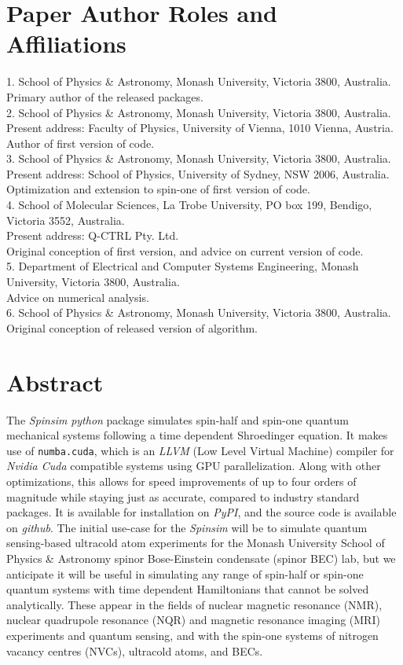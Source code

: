 \documentclass{jors}
\begin{document}
\section{Paper Author Roles and Affiliations}
1. School of Physics \& Astronomy, Monash University, Victoria 3800, Australia.\\
	Primary author of the released packages.\\
2. School of Physics \& Astronomy, Monash University, Victoria 3800, Australia.\\
	Present address: Faculty of Physics, University of Vienna, 1010 Vienna, Austria.\\
	Author of first version of code.\\
3. School of Physics \& Astronomy, Monash University, Victoria 3800, Australia.\\
	Present address: School of Physics, University of Sydney, NSW 2006, Australia.\\
	Optimization and extension to spin-one of first version of code.\\
4. School of Molecular Sciences, La Trobe University, PO box 199, Bendigo, Victoria 3552, Australia.\\
	Present address: Q-CTRL Pty. Ltd.\\
	Original conception of first version, and advice on current version of code.\\
5. Department of Electrical and Computer Systems Engineering, Monash University, Victoria 3800, Australia.\\
	Advice on numerical analysis.\\
6. School of Physics \& Astronomy, Monash University, Victoria 3800, Australia.\\
	Original conception of released version of algorithm.

\section{Abstract}
	The \emph{Spinsim} \emph{python} package simulates spin-half and spin-one quantum mechanical systems following a time dependent Shroedinger equation.
	It makes use of \texttt{numba.cuda}, which is an \emph{LLVM} (Low Level Virtual Machine) compiler for \emph{Nvidia Cuda} compatible systems using GPU parallelization. 
	Along with other optimizations, this allows for speed improvements of up to four orders of magnitude while staying just as accurate, compared to industry standard packages.
	It is available for installation on \emph{PyPI}, and the source code is available on \emph{github}.
	The initial use-case for the \emph{Spinsim} will be to simulate quantum sensing-based ultracold atom experiments for the Monash University School of Physics \& Astronomy spinor Bose-Einstein condensate (spinor BEC) lab, but we anticipate it will be useful in simulating any range of spin-half or spin-one quantum systems with time dependent Hamiltonians that cannot be solved analytically.
	These appear in the fields of nuclear magnetic resonance (NMR), nuclear quadrupole resonance (NQR) and magnetic resonance imaging (MRI) experiments and quantum sensing, and with the spin-one systems of nitrogen vacancy centres (NVCs), ultracold atoms, and BECs.
\end{document}
